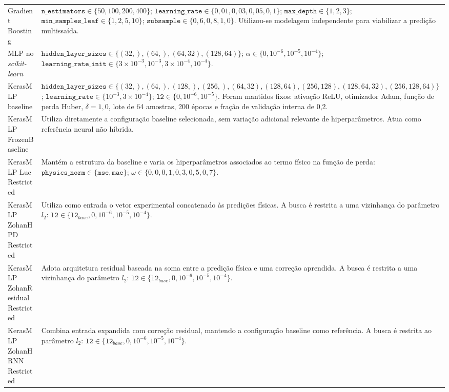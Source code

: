 \begin{longtable}{p{3.8cm} p{9.8cm}}
Gradient Boosting
&
\(\texttt{n\_estimators} \in \{50,100,200,400\}\);
\(\texttt{learning\_rate} \in \{0{,}01,0{,}03,0{,}05,0{,}1\}\);
\(\texttt{max\_depth} \in \{1,2,3\}\);
\(\texttt{min\_samples\_leaf} \in \{1,2,5,10\}\);
\(\texttt{subsample} \in \{0{,}6,0{,}8,1{,}0\}\).
Utilizou-se modelagem independente para viabilizar a predição multissaída. \\

MLP no \textit{scikit-learn}
&
\(\texttt{hidden\_layer\_sizes} \in \{(32,), (64,), (64,32), (128,64)\}\);
\(\alpha \in \{0,10^{-6},10^{-5},10^{-4}\}\);
\(\texttt{learning\_rate\_init} \in \{3\times10^{-3},10^{-3},3\times10^{-4},10^{-4}\}\). \\

KerasMLP baseline
&
\(\texttt{hidden\_layer\_sizes} \in \{(32,), (64,), (128,), (256,), (64,32), (128,64), (256,128), (128,64,32), (256,128,64)\}\);
\(\texttt{learning\_rate} \in \{10^{-3},3\times10^{-4}\}\);
\(\texttt{l2} \in \{0,10^{-6},10^{-5}\}\).
Foram mantidos fixos: ativação ReLU, otimizador Adam, função de perda Huber, \(\delta=1{,}0\), lote de 64 amostras, 200 épocas e fração de validação interna de 0,2. \\

KerasMLP FrozenBaseline
&
Utiliza diretamente a configuração baseline selecionada, sem variação adicional relevante de hiperparâmetros. Atua como referência neural não híbrida. \\

KerasMLP Luc Restricted
&
Mantém a estrutura da baseline e varia os hiperparâmetros associados ao termo físico na função de perda:
\(\texttt{physics\_norm} \in \{\texttt{mse},\texttt{mae}\}\);
\(\omega \in \{0{,}0,0{,}1,0{,}3,0{,}5,0{,}7\}\). \\

KerasMLP ZohanHPD Restricted
&
Utiliza como entrada o vetor experimental concatenado às predições físicas. A busca é restrita a uma vizinhança do parâmetro \(l_2\):
\(\texttt{l2} \in \{\texttt{l2}_{base},0,10^{-6},10^{-5},10^{-4}\}\). \\

KerasMLP ZohanResidual Restricted
&
Adota arquitetura residual baseada na soma entre a predição física e uma correção aprendida. A busca é restrita a uma vizinhança do parâmetro \(l_2\):
\(\texttt{l2} \in \{\texttt{l2}_{base},0,10^{-6},10^{-5},10^{-4}\}\). \\

KerasMLP ZohanHRNN Restricted
&
Combina entrada expandida com correção residual, mantendo a configuração baseline como referência. A busca é restrita ao parâmetro \(l_2\):
\(\texttt{l2} \in \{\texttt{l2}_{base},0,10^{-6},10^{-5},10^{-4}\}\). \\

\end{longtable}

